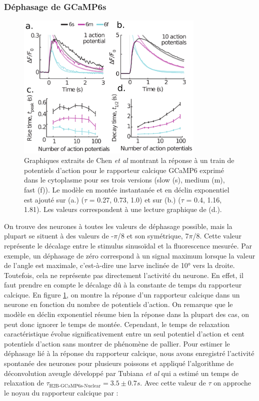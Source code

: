 \subsubsection{Déphasage de GCaMP6s}

\begin{figure}
\centering
\includegraphics[width=0.8\textwidth]{./files/chen2013_GCaMP6.svg.png}
\caption{Graphiques extraits de Chen \emph{et al} \cite{chen_ultrasensitive_2013}
montrant la réponse à un train de potentiels d'action pour le rapporteur calcique GCaMP6 exprimé dans le cytoplasme pour ses trois versions (slow (s), medium (m), fast (f)). Le modèle en montée instantanée et en déclin exponentiel est ajouté sur (a.) ($\tau$ = 0.27, 0.73, 1.0) et sur (b.) ($\tau$ = 0.4, 1.16, 1.81). Les valeurs correspondent à une lecture graphique de (d.). 
\label{FIGcalciumkernel}} 
\end{figure}

On trouve des neurones à toutes les valeurs de déphasage possible, mais la plupart se situent à des valeurs de -$\pi$/8 et son symétrique, 7$\pi$/8. Cette valeur représente le décalage entre le stimulus sinusoïdal et la fluorescence mesurée. Par exemple, un déphasage de zéro correspond à un signal maximum lorsque la valeur de l'angle est maximale, c'est-à-dire une larve inclinée de 10° vers la droite. Toutefois, cela ne représente pas directement l'activité du neurone. En effet, il faut prendre en compte le décalage dû à la constante de temps du rapporteur calcique. En figure \ref{FIGcalciumkernel}, on montre la réponse d'un rapporteur calcique dans un neurone en fonction du nombre de potentiels d'action. On remarque que le modèle en déclin exponentiel résume bien la réponse dans la plupart des cas, on peut donc ignorer le temps de montée. Cependant, le temps de relaxation caractéristique évolue significativement entre un seul potentiel d'action et cent potentiels d'action sans montrer de phénomène de pallier. Pour estimer le déphasage lié à la réponse du rapporteur calcique, nous avons enregistré l'activité spontanée des neurones pour plusieurs poissons et appliqué l'algorithme de déconvolution aveugle développé par Tubiana \emph{et al} \cite{tubiana_blind_2017} qui a estimé un temps de relaxation de $\tau_\text{H2B-GCaMP6s-Nuclear} = 3.5 \pm 0.7 s$. Avec cette valeur de $\tau$ on approche le noyau du rapporteur calcique par :

